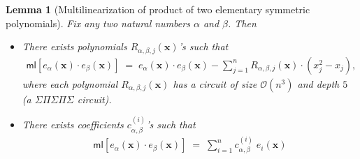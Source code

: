 \documentclass[11pt]{article}
\newtheorem{lemma}[theorem]{Lemma}
\newcommand{\bigO}{\mathcal{O}}
\newcommand{\ml}{\mathsf{ml}}
\begin{document}
\begin{lemma}[Multilinearization of product of two elementary symmetric polynomials]\label{lemma:ml-prod-two-elem}
Fix any two natural numbers $\alpha$ and $\beta$. Then
\begin{itemize}
    \item There exists polynomials $R_{\alpha, \beta,j}(\mathbf{x})$'s such that
    \begin{align*}
        \ml[e_{\alpha}(\mathbf{x}) \cdot e_{\beta}(\mathbf{x})] \; = \; e_{\alpha}(\mathbf{x}) \cdot e_{\beta}(\mathbf{x}) - \sum_{j=1}^{n} R_{\alpha, \beta, j}(\mathbf{x}) \cdot (x_{j}^{2} - x_{j}),
    \end{align*}
    where each polynomial $R_{\alpha, \beta, j}(\mathbf{x})$ has a circuit of size $\bigO(n^{3})$ and depth $5$ (a $\Sigma \Pi \Sigma \Pi \Sigma$ circuit).
    \item There exists coefficients $c_{\alpha, \beta}^{(i)}$'s such that
    \begin{align*}
        \ml[e_{\alpha}(\mathbf{x}) \cdot e_{\beta}(\mathbf{x})] \; = \; \sum_{i = 1}^{n} c_{\alpha,\beta}^{(i)} \; e_{i}(\mathbf{x})
    \end{align*}
\end{itemize}
\end{lemma}
\end{document}
